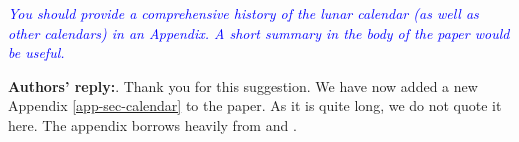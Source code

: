 \documentclass[12pt]{article}
\begin{document}
\begin{refsection}
\medskip

\textcolor{blue}{\textit{You should provide a comprehensive history of the lunar  calendar (as well as other calendars) in an Appendix.  A short summary in the body of the paper would be useful.}}

\medskip

\vspace{.5cm}
\textbf{Authors' reply:}. Thank you for this suggestion.  We have now added a new Appendix \ref{app-sec-calendar} to the paper.  As it is quite long, we do not quote it here.  The appendix borrows heavily from \citet{depuydt1997civil} and \citet{mckay2016coligny}.  

\medskip

\vspace{1cm}

\printbibliography

\end{refsection}

\newpage \clearpage
\end{document}
